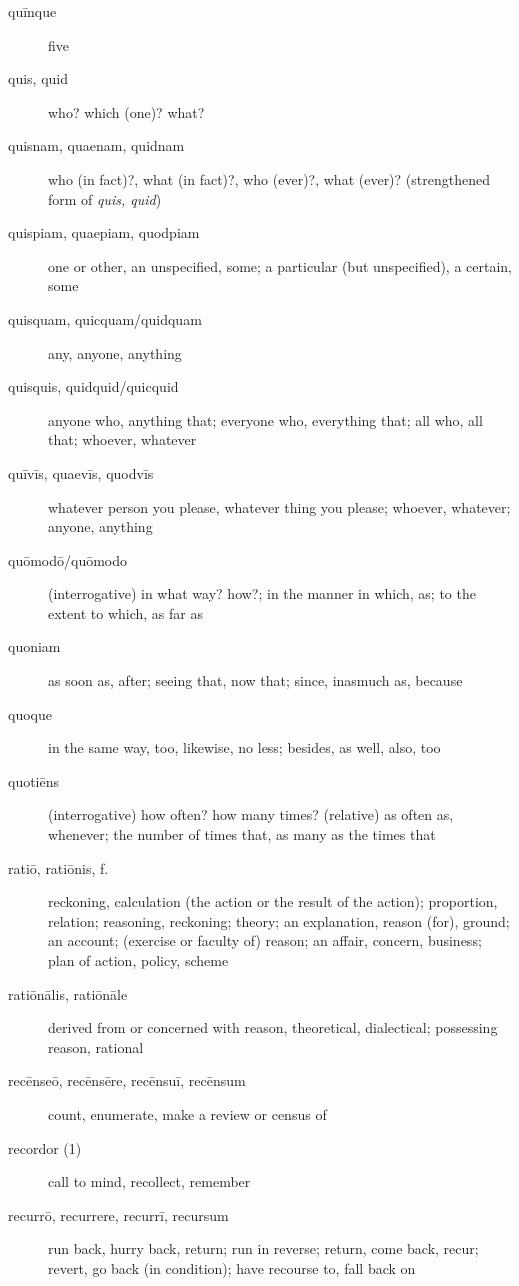 \begin{description}
    \item[quīnque] \marginnote{*}five
    \item[quis, quid] \marginnote{*}who? which (one)? what?
    \item[quisnam, quaenam, quidnam] who (in fact)?, what (in fact)?, who (ever)?, what (ever)? (strengthened form of \textit{quis, quid})
    \item[quispiam, quaepiam, quodpiam] one or other, an unspecified, some; a particular (but unspecified), a certain, some
    \item[quisquam, quicquam/quidquam] \marginnote{*}any, anyone, anything
    \item[quisquis, quidquid/quicquid] \marginnote{*}anyone who, anything that; everyone who, everything that; all who, all that; whoever, whatever
    \item[quīvīs, quaevīs, quodvīs] whatever person you please, whatever thing you please; whoever, whatever; anyone, anything
    \item[quōmodō/quōmodo] (interrogative) in what way? how?; in the manner in which, as; to the extent to which, as far as
    \item[quoniam] \marginnote{*}as soon as, after; seeing that, now that; since, inasmuch as, because
    \item[quoque] \marginnote{*}in the same way, too, likewise, no less; besides, as well, also, too
    \item[quotiēns] \marginnote{*}(interrogative) how often? how many times? (relative) as often as, whenever; the number of times that, as many as the times that
    \item[ratiō, ratiōnis, f.] \marginnote{*}reckoning, calculation (the action or the result of the action); proportion, relation; reasoning, reckoning; theory; an explanation, reason (for), ground; an account; (exercise or faculty of) reason; an affair, concern, business; plan of action, policy, scheme
    \item[ratiōnālis, ratiōnāle] derived from or concerned with reason, theoretical, dialectical; possessing reason, rational
    \item[recēnseō, recēnsēre, recēnsuī, recēnsum] count, enumerate, make a review or census of
    \item[recordor (1)] call to mind, recollect, remember
    \item[recurrō, recurrere, recurrī, recursum] run back, hurry back, return; run in reverse; return, come back, recur; revert, go back (in condition); have recourse to, fall back on

\end{description}
